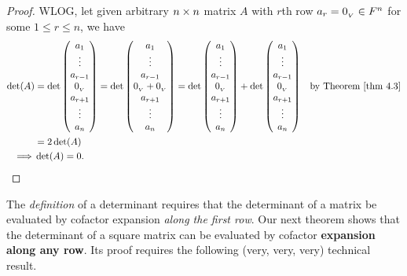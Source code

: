 \begin{proof}
WLOG, let given arbitrary \(n \times n\) matrix \(A\) with \(r\)th row \(a_r = 0_{_V} \in F^n\) for some \(1 \le r \le n\), we have
\begin{align*}
    \det(A) & = \det \begin{pmatrix} a_1 \\ \vdots \\ a_{r - 1} \\ \OV \\ a_{r + 1} \\ \vdots \\ a_n \end{pmatrix} = \det \begin{pmatrix} a_1 \\ \vdots \\ a_{r - 1} \\ \OV + \OV \\ a_{r + 1} \\ \vdots \\ a_n \end{pmatrix}
    = \det \begin{pmatrix} a_1 \\ \vdots \\ a_{r - 1} \\ \OV \\ a_{r + 1} \\ \vdots \\ a_n \end{pmatrix}
    + \det \begin{pmatrix} a_1 \\ \vdots \\ a_{r - 1} \\ \OV \\ a_{r + 1} \\ \vdots \\ a_n \end{pmatrix} & \text{by \THM{4.3}} \\
            & = 2 \det(A) \\
    \implies & \det(A) = 0.
\end{align*}
\end{proof}

The \emph{definition} of a determinant requires that the determinant of a matrix be evaluated by cofactor expansion \emph{along the first row}.
Our next theorem shows that the determinant of a square matrix can be evaluated by cofactor \textbf{expansion along any row}.
Its proof requires the following (very, very, very) technical result.

